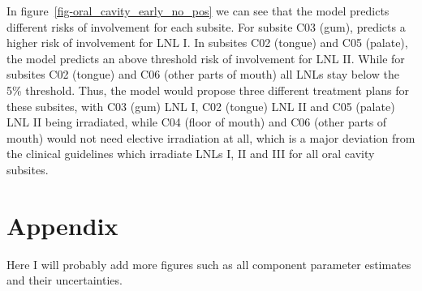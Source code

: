 \documentclass[
  sn-mathphys-num,
]{sn-jnl}
\begin{document}
In figure~\ref{fig-oral_cavity_early_no_pos} we can see that the model
predicts different risks of involvement for each subsite. For subsite
C03 (gum), predicts a higher risk of involvement for LNL I. In subsites
C02 (tongue) and C05 (palate), the model predicts an above threshold
risk of involvement for LNL II. While for subsites C02 (tongue) and C06
(other parts of mouth) all LNLs stay below the 5\% threshold. Thus, the
model would propose three different treatment plans for these subsites,
with C03 (gum) LNL I, C02 (tongue) LNL II and C05 (palate) LNL II being
irradiated, while C04 (floor of mouth) and C06 (other parts of mouth)
would not need elective irradiation at all, which is a major deviation
from the clinical guidelines which irradiate LNLs I, II and III for all
oral cavity subsites.

\section{Appendix}\label{appendix}

Here I will probably add more figures such as all component parameter
estimates and their uncertainties.


  
\end{document}
